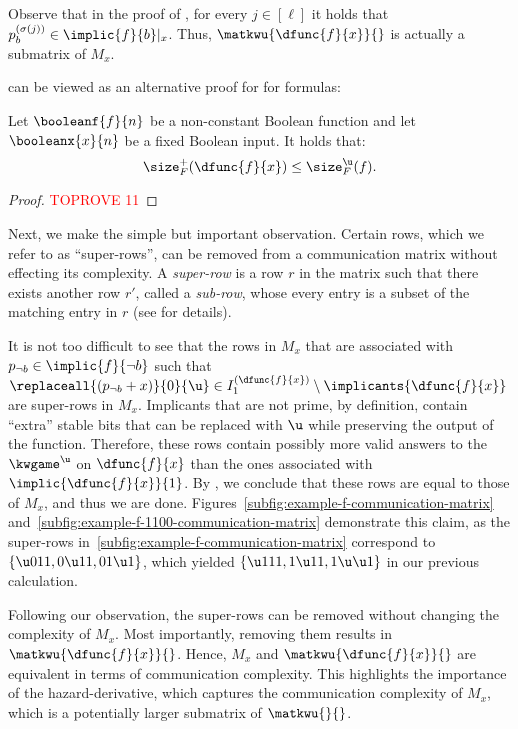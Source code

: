 \documentclass[acmsmall, nonacm, authorversion]{acmart}
\begin{document}
\begin{remark}\label{rem:mdf-submatrix-mf}
Observe that in the proof of , for every $j\in[\ell]$ it holds that $p_{b}^{(\sigma(j))}\in \implic{f}{b}|_x$. Thus, $\matkwu{\dfunc{f}{x}}{}$ is actually a submatrix of $M_x$.
\end{remark}

 can be viewed as an alternative proof for  for formulas:

\begin{corollary}\label{cor:derivative-lower-bound}
Let $\booleanf{f}{n}$ be a non-constant Boolean function and let $\booleanx{x}{n}$ be a fixed Boolean input. It holds that:
\[
\size_{F}^{+}(\dfunc{f}{x})\le \size_{F}^{\u}(f).
\]
\end{corollary}
\begin{proof}\textcolor{red}{TOPROVE 11}\end{proof}

Next, we make the simple but important observation. Certain rows, which we refer to as ``super-rows'', can be removed from a communication matrix without effecting its complexity. A \emph{super-row} is a row $r$ in the matrix such that there exists another row $r'$, called a \emph{sub-row}, whose every entry is a subset of the matching entry in $r$ (see  for details). 

It is not too difficult to see that the rows in $M_x$ that are associated with $p_{\neg b}\in \implic{f}{\neg b}$ such that $\replaceall{(p_{\neg b}+x)}{0}{\u}\in I_1^{(\dfunc{f}{x})}\setminus \implicants{\dfunc{f}{x}}$ are super-rows in $M_x$. Implicants that are not prime, by definition, contain ``extra'' stable bits that can be replaced with $\u$ while preserving the output of the function. Therefore, these rows contain possibly more valid answers to the $\kwgame^\u$ on $\dfunc{f}{x}$ than the ones associated with $\implic{\dfunc{f}{x}}{1}$. By , we conclude that these rows are equal to those of $M_x$, and thus we are done. Figures~\ref{subfig:example-f-communication-matrix} and~\ref{subfig:example-f-1100-communication-matrix} demonstrate this claim, as the super-rows in~\ref{subfig:example-f-communication-matrix} correspond to $\{\u 011, 0\u11,01\u1\}$, which yielded $\{\u 111, 1\u 11, 1\u\u1\}$ in our previous calculation.

Following our observation, the super-rows can be removed without changing the complexity of $M_x$. Most importantly, removing them results in $\matkwu{\dfunc{f}{x}}{}$. Hence, $M_x$ and $\matkwu{\dfunc{f}{x}}{}$ are equivalent in terms of communication complexity. This highlights the importance of the hazard-derivative, which captures the communication complexity of $M_x$, which is a potentially larger submatrix of $\matkwu{}{}$.
\end{document}
